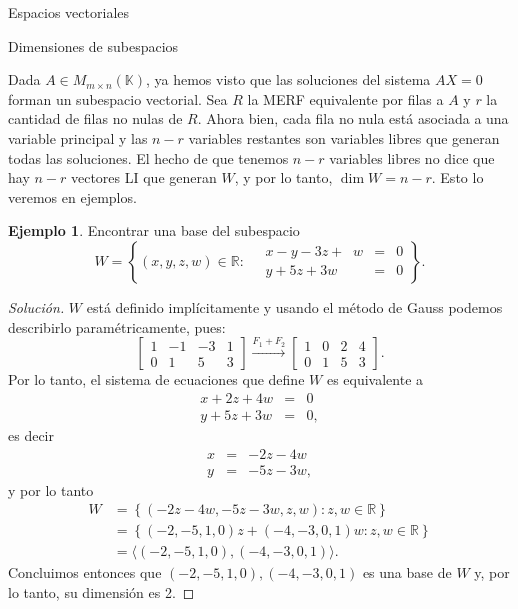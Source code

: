 \documentclass[a4paper,12pt,twoside,spanish,reqno]{amsbook}
\theoremstyle{definition}
\newtheorem{ejemplo}{Ejemplo}[section]
\theoremstyle{remark}
\newcommand{\K}{\mathbb K}
\begin{document}
\begin{chapter}{Espacios vectoriales}
	
	\begin{section}{Dimensiones de subespacios}\label{sec-dimensiones-de-subespacios}
		
			
		Dada $A \in M_{m\times n}(\K)$,  ya hemos visto que  las soluciones del sistema $AX=0$ forman un subespacio vectorial. Sea $R $ la MERF equivalente por filas a $A$ y $r$ la cantidad de filas no nulas de $R$. Ahora bien, cada fila no nula está asociada  a una  variable principal y las  $n-r$ variables restantes son variables libres  que generan  todas las soluciones.
		El  hecho de que tenemos $n-r$ variables libres no dice que hay $n-r$ vectores LI que generan $W$, y por lo tanto,  $\dim W = n-r$. Esto lo veremos en ejemplos.
		
		\begin{ejemplo}
			Encontrar una base del subespacio 
			$$
			W = \left\{(x,y,z,w) \in \mathbb{R}: \quad\begin{array}{rcl}
			x-y -3z +\;\;w &=& 0 \\ y +5z +3w &=& 0
			\end{array} \right\}.
			$$
		\end{ejemplo}
		\begin{proof}[Solución]
			$W$  está definido implícitamente y usando el método de Gauss podemos describirlo paramétricamente, pues:
			\begin{equation*}
			\begin{bmatrix}1&-1&-3&1 \\ 0&1&5&3  \end{bmatrix}
			\stackrel{F_1+F_2}{\longrightarrow} 
			\begin{bmatrix}1&0&2&4 \\ 0&1&5&3  \end{bmatrix}.
			\end{equation*}
			Por lo tanto, el sistema de ecuaciones que define $W$ es equivalente a 
			\begin{equation*}
			\begin{array}{rcl}
			x  +2z +4w &=& 0 \\ y +5z +3w &=& 0,
			\end{array}
			\end{equation*}
			es decir 
			\begin{equation*}
			\begin{array}{rcl}
			x  &=& -2z - 4w  \\ y &=& -5z -3w ,
			\end{array}
			\end{equation*}
			y por lo tanto
			\begin{align*}
			W &= \left\{(-2z -4w,-5z -3w,z,w) : z,w\in \mathbb{R} \right\} \\
			&= \left\{(-2,-5,1,0)z+(-4, -3,0,1)w : z,w\in \mathbb{R} \right\}\\
			&= \langle (-2,-5,1,0),(-4, -3,0,1)\rangle.
			\end{align*}
			Concluimos entonces que $(-2,-5,1,0),(-4, -3,0,1)$  es una base de $W$ y, por lo tanto,  su dimensión es 2.
		\end{proof}
		

\end{section}
\end{chapter}
\end{document}
